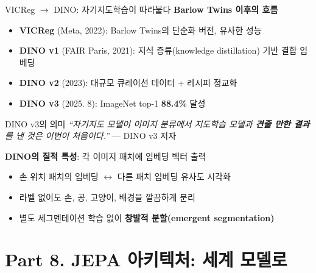 \documentclass[aspectratio=169,10pt]{beamer}
\begin{document}
\begin{frame}{VICReg $\to$ DINO: 자기지도학습이 따라붙다}
\textbf{Barlow Twins 이후의 흐름}
\begin{itemize}
  \item \textbf{VICReg} (Meta, 2022): Barlow Twins의 단순화 버전, 유사한 성능
  \item \textbf{DINO v1} (FAIR Paris, 2021): 지식 증류(knowledge distillation) 기반 결합 임베딩
  \item \textbf{DINO v2} (2023): 대규모 큐레이션 데이터 + 레시피 정교화
  \item \textbf{DINO v3} (2025. 8): \alert{ImageNet top-1 \textbf{88.4\%}} 달성
\end{itemize}

\vspace{0.4em}
\begin{block}{DINO v3의 의미}
\textit{``자기지도 모델이 이미지 분류에서 지도학습 모델과 \textbf{견줄 만한 결과}를 낸 것은 이번이 처음이다.''} --- DINO v3 저자
\end{block}

\vspace{0.4em}
\textbf{DINO의 질적 특성}: 각 이미지 패치에 임베딩 벡터 출력

\begin{itemize}
  \item 손 위치 패치의 임베딩 $\leftrightarrow$ 다른 패치 임베딩 유사도 시각화
  \item 라벨 없이도 \alert{손, 공, 고양이, 배경}을 깔끔하게 분리
  \item 별도 세그멘테이션 학습 없이 \textbf{창발적 분할(emergent segmentation)}
\end{itemize}
\end{frame}

\section{Part 8. JEPA 아키텍처: 세계 모델로}
\end{document}
